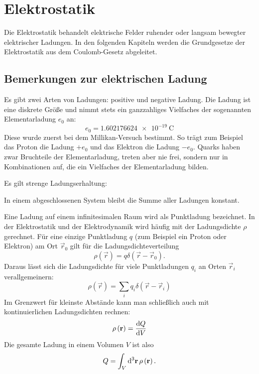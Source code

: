 
\chapter{Elektrostatik}

Die Elektrostatik behandelt elektrische Felder ruhender oder langsam bewegter elektrischer Ladungen. In den folgenden Kapiteln werden die Grundgesetze der Elektrostatik aus dem Coulomb-Gesetz abgeleitet.

\section{Bemerkungen zur elektrischen Ladung}

Es gibt zwei Arten von Ladungen: positive und negative Ladung. Die Ladung ist eine diskrete Größe und nimmt stets ein ganzzahliges Vielfaches der sogenannten Elementarladung $e_{0}$ an:
\begin{equation*}
	e_{0}=\SI{1.602176624e-19}{\coulomb}
\end{equation*}
Diese wurde zuerst bei dem Millikan-Versuch bestimmt. So trägt zum Beispiel das Proton die Ladung $+e_{0}$ und das Elektron die Ladung $-e_{0}$. Quarks haben zwar Bruchteile der Elementarladung, treten aber nie frei, sondern nur in Kombinationen auf, die ein Vielfaches der Elementarladung bilden.

Es gilt strenge Ladungserhaltung:
\begin{formal}
	In einem abgeschlossenen System bleibt die Summe aller Ladungen konstant.
\end{formal}
Eine Ladung auf einem infinitesimalen Raum wird als Punktladung bezeichnet. In der Elektrostatik und der Elektrodynamik wird häufig mit der Ladungsdichte $\rho $ gerechnet. Für eine einzige Punktladung $q$ (zum Beispiel ein Proton oder Elektron) am Ort $\vec {r}_{0}$ gilt für die Ladungsdichteverteilung
\begin{equation*}
	\rho \left(\vec {r}\right)=q\delta \left(\vec {r}-\vec {r}_{0}\right).
\end{equation*}
Daraus lässt sich die Ladungsdichte für viele Punktladungen $q_{i}$ an Orten $\vec {r}_{i}$ verallgemeinern:
\begin{equation*}
	\rho \left(\vec {r}\right)=\sum _{i}q_{i}\delta \left(\vec {r}-\vec {r}_{i}\right)
\end{equation*}
Im Grenzwert für kleinste Abstände kann man schließlich auch mit kontinuierlichen Ladungsdichten rechnen:
\begin{equation*}
	\rho \left(\vec {r}\right)=\frac{\diff Q}{\diff V}
\end{equation*}
Die gesamte Ladung in einem Volumen $V$ ist also
\begin{equation*}
	Q=\int _{V}\diffa[3]{\vec{r}}\rho \left(\vec {r}\right).
\end{equation*}



